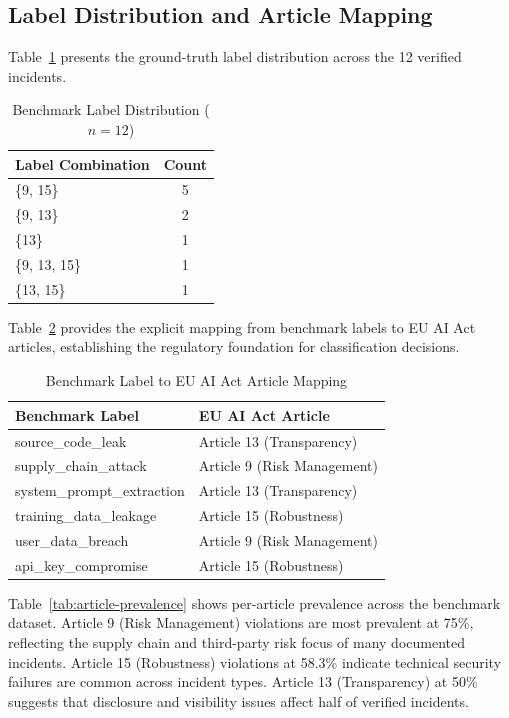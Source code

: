 \documentclass[10pt,conference]{IEEEtran}
\begin{document}
\subsection{Label Distribution and Article Mapping}

Table~\ref{tab:labels} presents the ground-truth label distribution across the 12 verified incidents.

\begin{table}[htbp]
\caption{Benchmark Label Distribution ($n=12$)}
\label{tab:labels}
\centering
\begin{tabular}{lc}
\toprule
\textbf{Label Combination} & \textbf{Count} \\
\midrule
\{9, 15\} & 5 \\
\{9, 13\} & 2 \\
\{13\} & 1 \\
\{9, 13, 15\} & 1 \\
\{13, 15\} & 1 \\
\bottomrule
\end{tabular}
\end{table}

Table~\ref{tab:article-mapping} provides the explicit mapping from benchmark labels to EU AI Act articles, establishing the regulatory foundation for classification decisions.

\begin{table}[htbp]
\caption{Benchmark Label to EU AI Act Article Mapping}
\label{tab:article-mapping}
\centering
\begin{tabular}{ll}
\toprule
\textbf{Benchmark Label} & \textbf{EU AI Act Article} \\
\midrule
source\_code\_leak & Article 13 (Transparency) \\
supply\_chain\_attack & Article 9 (Risk Management) \\
system\_prompt\_extraction & Article 13 (Transparency) \\
training\_data\_leakage & Article 15 (Robustness) \\
user\_data\_breach & Article 9 (Risk Management) \\
api\_key\_compromise & Article 15 (Robustness) \\
\bottomrule
\end{tabular}
\end{table}

Table~\ref{tab:article-prevalence} shows per-article prevalence across the benchmark dataset. Article 9 (Risk Management) violations are most prevalent at 75\%, reflecting the supply chain and third-party risk focus of many documented incidents. Article 15 (Robustness) violations at 58.3\% indicate technical security failures are common across incident types. Article 13 (Transparency) at 50\% suggests that disclosure and visibility issues affect half of verified incidents.
\end{document}
